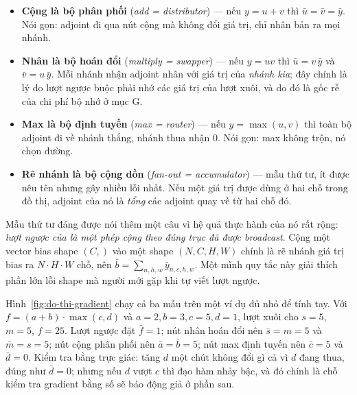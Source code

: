 \documentclass[../../../deep_learning.tex]{subfiles}
\begin{document}
\begin{itemize}
\item \textbf{Cộng là bộ phân phối} (\emph{add = distributor}) --- nếu \(y = u + v\) thì \(\bar u = \bar v = \bar y\). Nói gọn: adjoint đi qua nút cộng mà không đổi giá trị, chỉ nhân bản ra mọi nhánh.
\item \textbf{Nhân là bộ hoán đổi} (\emph{multiply = swapper}) --- nếu \(y = uv\) thì \(\bar u = v\,\bar y\) và \(\bar v = u\,\bar y\). Mỗi nhánh nhận adjoint nhân với giá trị của \emph{nhánh kia}; đây chính là lý do lượt ngược buộc phải nhớ các giá trị của lượt xuôi, và do đó là gốc rễ của chi phí bộ nhớ ở mục G.
\item \textbf{Max là bộ định tuyến} (\emph{max = router}) --- nếu \(y = \max(u,v)\) thì toàn bộ adjoint đi về nhánh thắng, nhánh thua nhận \(0\). Nói gọn: max không trộn, nó chọn đường.
\item \textbf{Rẽ nhánh là bộ cộng dồn} (\emph{fan-out = accumulator}) --- mẫu thứ tư, ít được nêu tên nhưng gây nhiều lỗi nhất. Nếu một giá trị được dùng ở hai chỗ trong đồ thị, adjoint của nó là \emph{tổng} các adjoint quay về từ hai chỗ đó.
\end{itemize}

Mẫu thứ tư đáng được nói thêm một câu vì hệ quả thực hành của nó rất rộng: \emph{lượt ngược của  là một phép cộng theo đúng trục đã được broadcast}. Cộng một vector bias shape \((C,)\) vào một  shape \((N,C,H,W)\) chính là rẽ nhánh giá trị bias ra \(N\cdot H\cdot W\) chỗ, nên \(\bar b = \sum_{n,h,w} \bar y_{n,c,h,w}\). Một mình quy tắc này giải thích phần lớn lỗi shape mà người mới gặp khi tự viết lượt ngược.

Hình~\ref{fig:do-thi-gradient} chạy cả ba mẫu trên một ví dụ đủ nhỏ để tính tay. Với \(f = (a+b)\cdot\max(c,d)\) và \(a=2, b=3, c=5, d=1\), lượt xuôi cho \(s = 5\), \(m = 5\), \(f = 25\). Lượt ngược đặt \(\bar f = 1\); nút nhân hoán đổi nên \(\bar s = m = 5\) và \(\bar m = s = 5\); nút cộng phân phối nên \(\bar a = \bar b = 5\); nút max định tuyến nên \(\bar c = 5\) và \(\bar d = 0\). Kiểm tra bằng trực giác: tăng \(d\) một chút không đổi gì cả vì \(d\) đang thua, đúng như \(\bar d = 0\); nhưng nếu \(d\) vượt \(c\) thì đạo hàm nhảy bậc, và đó chính là chỗ kiểm tra gradient bằng số sẽ báo động giả ở phần sau.
\end{document}

